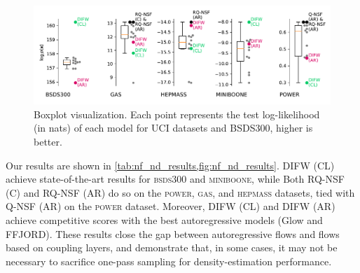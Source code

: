 \begin{figure}[!htb]
  \begin{center}
  \includegraphics[width=\linewidth]{figures/ND/resultsND_boxplot2.pdf}
  \vspace{-0.8cm}
  \caption{Boxplot visualization. Each point represents the test log-likelihood (in nats) of each model for UCI datasets and BSDS300, higher is better.}
  \label{fig:nf_nd_results}
  \end{center}
\end{figure}


Our results are shown in \cref{tab:nf_nd_results,fig:nf_nd_results}.
DIFW (CL) achieve state-of-the-art results for \textsc{bsds300} and \textsc{miniboone}, while Both RQ-NSF (C) and RQ-NSF (AR) do so on the \textsc{power}, \textsc{gas}, and \textsc{hepmass} datasets, tied with Q-NSF (AR) on the \textsc{power} dataset. Moreover, DIFW (CL) and DIFW (AR) achieve competitive scores with the best autoregressive models (Glow and FFJORD). These results close the gap between autoregressive flows and flows based on coupling layers, and demonstrate that, in some cases, it may not be necessary to sacrifice one-pass sampling for density-estimation performance.

